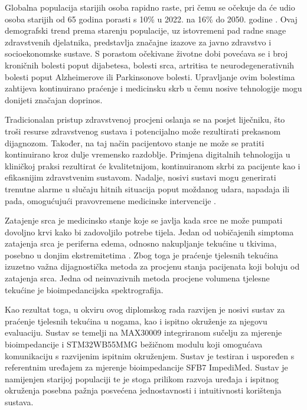 \documentclass[../diplomski_rad.tex]{subfiles}
\begin{document}
\sloppy

\justifying

Globalna populacija starijih osoba rapidno raste, pri čemu se očekuje da će udio osoba 
starijih od 65 godina porasti s 10\% u 2022. na 16\% do 2050. godine \cite{Chen2023}. 
Ovaj demografski trend prema starenju populacije, uz istovremeni pad radne snage zdravstvenih djelatnika, predstavlja značajne izazove za 
javno zdravstvo i socioekonomske sustave. 
S porastom očekivane životne dobi povećava se i broj kroničnih bolesti poput dijabetesa, 
bolesti srca, artritisa te neurodegenerativnih bolesti poput Alzheimerove ili Parkinsonove bolesti. 
Upravljanje ovim bolestima zahtijeva kontinuirano praćenje i medicinsku skrb u čemu 
nosive tehnologije mogu donijeti značajan doprinos. 

Tradicionalan pristup zdravstvenoj procjeni oslanja se na posjet liječniku, što troši resurse zdravstvenog sustava 
i potencijalno može rezultirati prekasnom dijagnozom. 
Također, na taj način pacijentovo stanje ne može se pratiti kontinuirano kroz dulje vremensko razdoblje.
Primjena digitalnih tehnologija u kliničkoj praksi rezultirat će kvalitetnijom, kontinuiranom skrbi za pacijente kao i 
efikasnijim zdravstvenim sustavom. 
Nadalje, nosivi sustavi mogu generirati trenutne alarme u slučaju hitnih situacija poput moždanog udara, 
napadaja ili pada, omogućujući pravovremene medicinske intervencije \cite{Chen2023}.

Zatajenje srca je medicinsko stanje koje se javlja kada srce ne može pumpati dovoljno krvi kako bi 
zadovoljilo potrebe tijela. Jedan od uobičajenih simptoma zatajenja srca je periferna edema, odnosno nakupljanje 
tekućine u tkivima, posebno u donjim ekstremitetima \cite{Abassi2022}. Zbog toga je praćenje tjelesnih tekućina izuzetno važna 
dijagnostička metoda za procjenu stanja pacijenata koji boluju od zatajenja srca. Jedna od neinvazivnih metoda 
procjene volumena tjelesne tekućine je bioimpedancijska spektrografija. 

Kao rezultat toga, u okviru ovog diplomskog rada razvijen je nosivi sustav za praćenje tjelesnih tekućina u nogama, 
kao i ispitno okruženje za njegovu evaluaciju. 
Sustav se temelji na MAX30009 integriranom sučelju za mjerenje bioimpedancije i STM32WB55MMG bežičnom modulu koji omogućava komunikaciju 
s razvijenim ispitnim okruženjem. Sustav je testiran i uspoređen s referentnim uređajem za mjerenje bioimpedancije SFB7 ImpediMed.
Sustav je namijenjen starijoj populaciji te je stoga prilikom razvoja uređaja i ispitnog okruženja 
posebna pažnja posvećena jednostavnosti i intuitivnosti korištenja sustava. 
\end{document}

